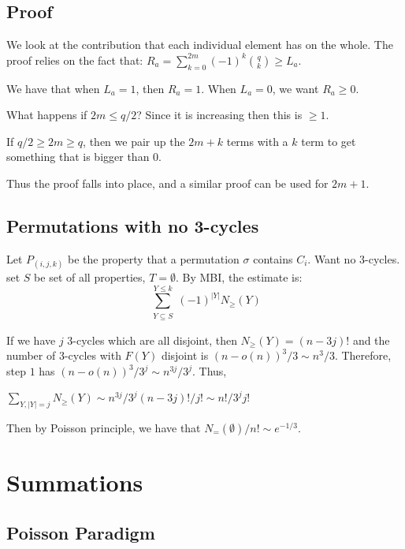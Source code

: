 \documentclass[]{article}
\theoremstyle{definition}
\numberwithin{theorem}{section}
\numberwithin{equation}{section}
\begin{document}
\subsection{Proof}
We look at the contribution that each individual element has on the whole. 
The proof relies on the fact that:
$R_a = \sum_{k = 0}^{2m} (-1)^k \binom{q}{k} \geq L_a$. 

We have that when $L_a = 1$, then $R_a = 1$. When $L_a = 0$, we want $R_a \geq 0$. 

What happens if $2m \leq q/2$? Since it is increasing then this is $\geq 1$.

If $q/2 \geq 2m \geq q$, then we pair up the $2m + k$ terms with a $k$ term to get something that is bigger than 0.

Thus the proof falls into place, and a similar proof can be used for $2m + 1$. 

\subsection{Permutations with no 3-cycles}
Let $P_{(i,j,k)}$ be the property that a permutation $\sigma$ contains $C_i$. Want no 3-cycles. set $S$ be set of all properties, $T = \emptyset$. By MBI, the estimate is:
\begin{equation}
	\sum_{\substack{Y \subseteq S}}^{Y \leq k} (-1)^{|Y|} N_\geq(Y)
\end{equation}

If we have $j$ 3-cycles which are all disjoint, then $N_\geq(Y) = (n - 3j)!$ and the number of 3-cycles with $F(Y)$ disjoint is $(n - o(n))^3/3 \sim n^3/ 3$. Therefore, step $1$ has $(n - o(n))^3/3^j \sim n^{3j}/3^j$. Thus, 

$\sum_{Y, |Y| = j} N_\geq (Y) \sim n^{3j}/3^j (n - 3j)!/j! \sim n!/3^j j!$

Then by Poisson principle, we have that $N_=(\emptyset)/n! \sim e^{- 1/3}$. 

\section{Summations}
\subsection{Poisson Paradigm}
\end{document}
